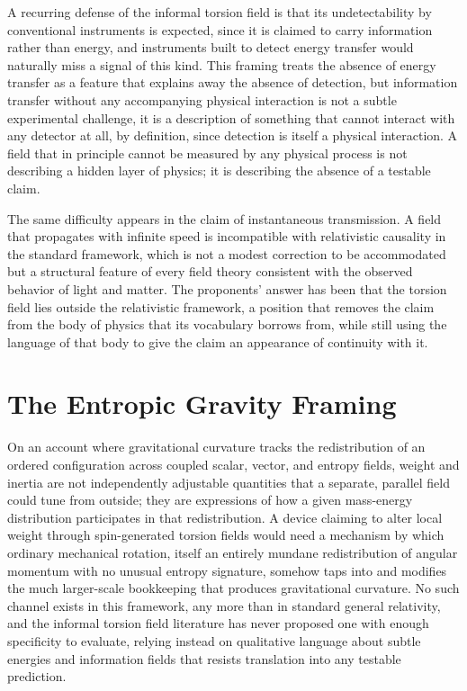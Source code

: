 \documentclass[11pt]{article}
\begin{document}
A recurring defense of the informal torsion field is that its undetectability by conventional instruments is expected, since it is claimed to carry information rather than energy, and instruments built to detect energy transfer would naturally miss a signal of this kind. This framing treats the absence of energy transfer as a feature that explains away the absence of detection, but information transfer without any accompanying physical interaction is not a subtle experimental challenge, it is a description of something that cannot interact with any detector at all, by definition, since detection is itself a physical interaction. A field that in principle cannot be measured by any physical process is not describing a hidden layer of physics; it is describing the absence of a testable claim.

The same difficulty appears in the claim of instantaneous transmission. A field that propagates with infinite speed is incompatible with relativistic causality in the standard framework, which is not a modest correction to be accommodated but a structural feature of every field theory consistent with the observed behavior of light and matter. The proponents' answer has been that the torsion field lies outside the relativistic framework, a position that removes the claim from the body of physics that its vocabulary borrows from, while still using the language of that body to give the claim an appearance of continuity with it.

\section{The Entropic Gravity Framing}

On an account where gravitational curvature tracks the redistribution of an ordered configuration across coupled scalar, vector, and entropy fields, weight and inertia are not independently adjustable quantities that a separate, parallel field could tune from outside; they are expressions of how a given mass-energy distribution participates in that redistribution. A device claiming to alter local weight through spin-generated torsion fields would need a mechanism by which ordinary mechanical rotation, itself an entirely mundane redistribution of angular momentum with no unusual entropy signature, somehow taps into and modifies the much larger-scale bookkeeping that produces gravitational curvature. No such channel exists in this framework, any more than in standard general relativity, and the informal torsion field literature has never proposed one with enough specificity to evaluate, relying instead on qualitative language about subtle energies and information fields that resists translation into any testable prediction.
\end{document}
